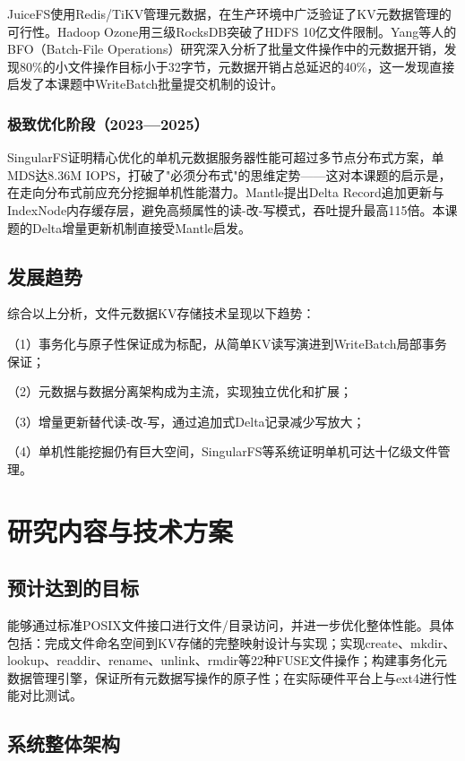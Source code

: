 \documentclass[supercite]{Hust-undergraduate-kaiti}
\theoremstyle{definition}
\begin{document}
JuiceFS使用Redis/TiKV管理元数据，在生产环境中广泛验证了KV元数据管理的可行性。Hadoop Ozone用三级RocksDB突破了HDFS 10亿文件限制。Yang等人的BFO（Batch-File Operations）\cite{ref_bfo}研究深入分析了批量文件操作中的元数据开销，发现80\%的小文件操作目标小于32字节，元数据开销占总延迟的40\%，这一发现直接启发了本课题中WriteBatch批量提交机制的设计。

\subsubsection{极致优化阶段（2023—2025）}

SingularFS\cite{ref_singularfs}证明精心优化的单机元数据服务器性能可超过多节点分布式方案，单MDS达8.36M IOPS，打破了"必须分布式"的思维定势——这对本课题的启示是，在走向分布式前应充分挖掘单机性能潜力。Mantle\cite{ref_mantle}提出Delta Record追加更新与IndexNode内存缓存层，避免高频属性的读-改-写模式，吞吐提升最高115倍。本课题的Delta增量更新机制直接受Mantle启发。

\subsection{发展趋势}

综合以上分析，文件元数据KV存储技术呈现以下趋势：

（1）事务化与原子性保证成为标配，从简单KV读写演进到WriteBatch局部事务保证；

（2）元数据与数据分离架构成为主流，实现独立优化和扩展；

（3）增量更新替代读-改-写，通过追加式Delta记录减少写放大；

（4）单机性能挖掘仍有巨大空间，SingularFS等系统证明单机可达十亿级文件管理。

\section{研究内容与技术方案}

\subsection{预计达到的目标}

能够通过标准POSIX文件接口进行文件/目录访问，并进一步优化整体性能。具体包括：完成文件命名空间到KV存储的完整映射设计与实现；实现create、mkdir、lookup、readdir、rename、unlink、rmdir等22种FUSE文件操作；构建事务化元数据管理引擎，保证所有元数据写操作的原子性；在实际硬件平台上与ext4进行性能对比测试。

\subsection{系统整体架构}
\end{document}
